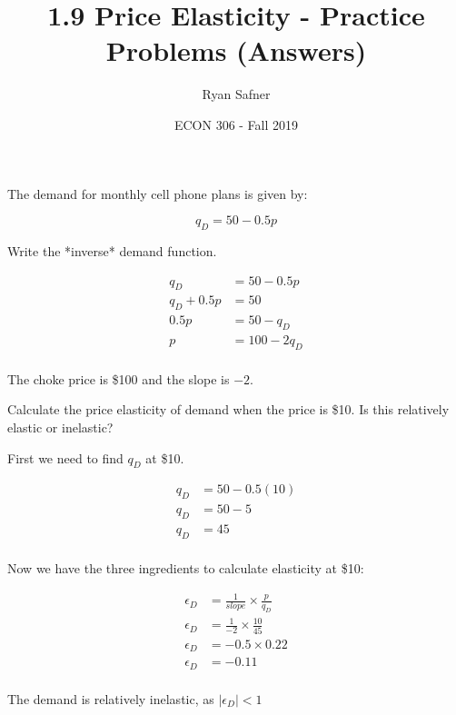 \documentclass[12 pt]{exam}
\title{1.9 Price Elasticity - Practice Problems (Answers)}
\author{Ryan Safner}
\date{ECON 306 - Fall 2019}
\begin{document}
\maketitle

The demand for monthly cell phone plans is given by:

$$q_D =  50-0.5p$$

\begin{questions}

\question  Write the *inverse* demand function.

\begin{solution}

\begin{align*}
	q_D&=50-0.5p\\
	q_D+0.5p&=50\\
	0.5p&=50-q_D\\
	p&=100-2q_D\\
\end{align*}

The choke price is \$100 and the slope is $-2$.

\end{solution}

\question Calculate the price elasticity of demand when the price is \$10. Is this relatively elastic or inelastic?

\begin{solution}

First we need to find $q_D$ at \$10. 

\begin{align*}
	q_D&=50-0.5(10)\\
	q_D&=50-5\\
	q_D&=45\\
\end{align*}

	Now we have the three ingredients to calculate elasticity at \$10:
	 
\begin{align*}
	\epsilon_D &=\frac{1}{slope} \times \frac{p}{q_D}	\\
	\epsilon_D &=\frac{1}{-2} \times \frac{10}{45}	\\
	\epsilon_D &=-0.5 \times 0.22\\
	\epsilon_D &=-0.11\\
\end{align*}

The demand is relatively inelastic, as $|\epsilon_D|<1$ 

\end{solution}


\end{questions}
\end{document}
